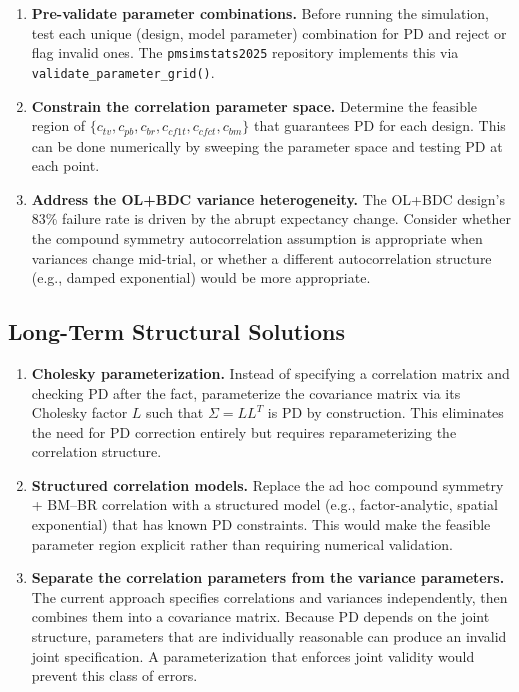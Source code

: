 \documentclass[11pt]{article}
\begin{document}
\begin{enumerate}
\item \textbf{Pre-validate parameter combinations.} Before
  running the simulation, test each unique (design, model
  parameter) combination for PD and reject or flag invalid
  ones. The \texttt{pmsimstats2025} repository implements
  this via \texttt{validate\_parameter\_grid()}.

\item \textbf{Constrain the correlation parameter space.}
  Determine the feasible region of $\{c_{tv}, c_{pb}, c_{br},
  c_{cf1t}, c_{cfct}, c_{bm}\}$ that guarantees PD for each
  design. This can be done numerically by sweeping the
  parameter space and testing PD at each point.

\item \textbf{Address the OL+BDC variance heterogeneity.}
  The OL+BDC design's 83\% failure rate is driven by the
  abrupt expectancy change. Consider whether the compound
  symmetry autocorrelation assumption is appropriate when
  variances change mid-trial, or whether a different
  autocorrelation structure (e.g., damped exponential) would
  be more appropriate.
\end{enumerate}

\subsection{Long-Term Structural Solutions}

\begin{enumerate}
\item \textbf{Cholesky parameterization.} Instead of specifying
  a correlation matrix and checking PD after the fact,
  parameterize the covariance matrix via its Cholesky factor
  $L$ such that $\Sigma = LL^T$ is PD by construction. This
  eliminates the need for PD correction entirely but requires
  reparameterizing the correlation structure.

\item \textbf{Structured correlation models.} Replace the
  ad hoc compound symmetry + BM--BR correlation with a
  structured model (e.g., factor-analytic, spatial
  exponential) that has known PD constraints. This would
  make the feasible parameter region explicit rather than
  requiring numerical validation.

\item \textbf{Separate the correlation parameters from the
  variance parameters.} The current approach specifies
  correlations and variances independently, then combines
  them into a covariance matrix. Because PD depends on the
  joint structure, parameters that are individually reasonable
  can produce an invalid joint specification. A parameterization
  that enforces joint validity would prevent this class of
  errors.
\end{enumerate}
\end{document}
